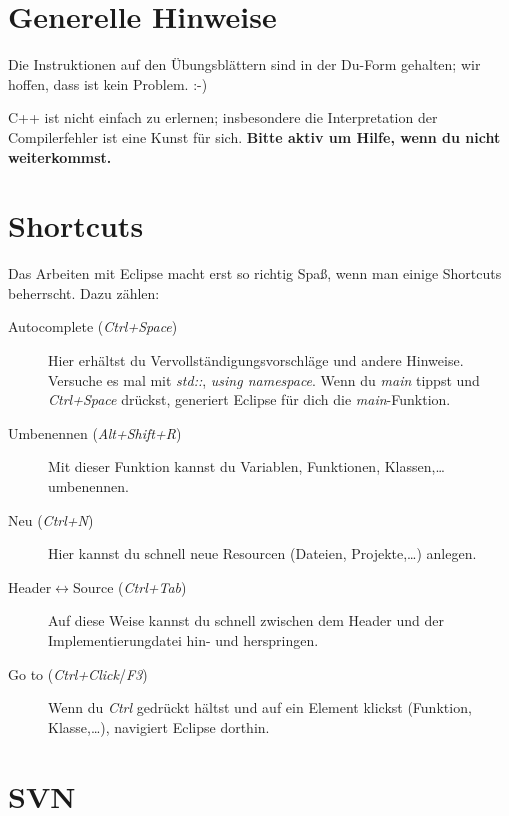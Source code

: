 

\newcommand{\tag}{1}

\cppSetTitle



\cppSetHeaderAndMakeTitle 


\section*{Generelle Hinweise}

Die Instruktionen auf den Übungsblättern sind in der Du-Form gehalten; wir hoffen, dass ist kein Problem. :-)

C++ ist nicht einfach zu erlernen; insbesondere die Interpretation der Compilerfehler ist eine Kunst für sich.
\textbf{Bitte aktiv um Hilfe, wenn du nicht weiterkommst.}

\section*{Shortcuts}

Das Arbeiten mit Eclipse macht erst so richtig Spaß, wenn man einige Shortcuts beherrscht.
Dazu zählen:
\begin{description}
	\item[Autocomplete (\emph{Ctrl+Space})]
	Hier erhältst du Vervollständigungsvorschläge und andere Hinweise.
	Versuche es mal mit \emph{std::}, \emph{using namespace}.
	Wenn du \emph{main} tippst und \emph{Ctrl+Space} drückst, generiert Eclipse für dich die \emph{main}-Funktion.
	
	\item[Umbenennen (\emph{Alt+Shift+R})]
	Mit dieser Funktion kannst du Variablen, Funktionen, Klassen,\dots umbenennen.
	
	\item[Neu (\emph{Ctrl+N})]
	Hier kannst du schnell neue Resourcen (Dateien, Projekte,\dots) anlegen.
	
	\item[Header$\leftrightarrow$Source (\emph{Ctrl+Tab})]
	Auf diese Weise kannst du schnell zwischen dem Header und der Implementierungdatei hin- und herspringen.
	
	\item[Go to (\emph{Ctrl+Click}/\emph{F3})] Wenn du \emph{Ctrl} gedrückt hältst und auf ein Element klickst (Funktion, Klasse,\dots), navigiert Eclipse dorthin.
\end{description}

\section*{SVN}

